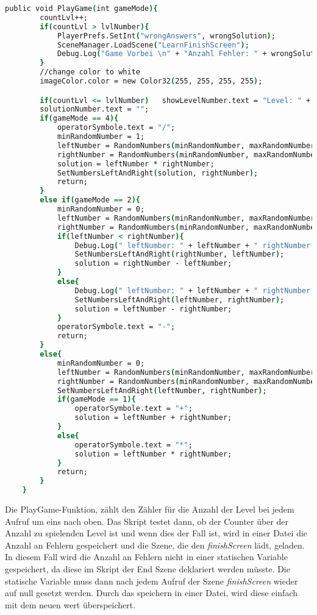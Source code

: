 \begin{lstlisting}[language=csh, caption={MathOperations.cs PlayGame-Funktion}]
public void PlayGame(int gameMode){
		countLvl++;
		if(countLvl > lvlNumber){
			PlayerPrefs.SetInt("wrongAnswers", wrongSolution);
			SceneManager.LoadScene("LearnFinishScreen");
			Debug.Log("Game Vorbei \n" + "Anzahl Fehler: " + wrongSolution);
		}
		//change color to white
		imageColor.color = new Color32(255, 255, 255, 255);

		if(countLvl <= lvlNumber)	showLevelNumber.text = "Level: " + countLvl + "/" + lvlNumber;
		solutionNumber.text = "";
		if(gameMode == 4){
			operatorSymbole.text = "/";
			minRandomNumber = 1;
			leftNumber = RandomNumbers(minRandomNumber, maxRandomNumber);
			rightNumber = RandomNumbers(minRandomNumber, maxRandomNumber);
			solution = leftNumber * rightNumber;
			SetNumbersLeftAndRight(solution, rightNumber);
			return;
		}
		else if(gameMode == 2){
			minRandomNumber = 0;
			leftNumber = RandomNumbers(minRandomNumber, maxRandomNumber);
			rightNumber = RandomNumbers(minRandomNumber, maxRandomNumber);
			if(leftNumber < rightNumber){
				Debug.Log(" leftNumber: " + leftNumber + " rightNumber: " + rightNumber + "zweite If");
				SetNumbersLeftAndRight(rightNumber, leftNumber);
				solution = rightNumber - leftNumber;
			}
			else{
				Debug.Log(" leftNumber: " + leftNumber + " rightNumber: " + rightNumber + "zweite If");
				SetNumbersLeftAndRight(leftNumber, rightNumber);
				solution = leftNumber - rightNumber;
			}
			operatorSymbole.text = "-";
			return;
		}
		else{
			minRandomNumber = 0;
			leftNumber = RandomNumbers(minRandomNumber, maxRandomNumber);
			rightNumber = RandomNumbers(minRandomNumber, maxRandomNumber);
			SetNumbersLeftAndRight(leftNumber, rightNumber);
			if(gameMode == 1){
				operatorSymbole.text = "+";
				solution = leftNumber + rightNumber;
			}
			else{
				operatorSymbole.text = "*";
				solution = leftNumber * rightNumber;
			}
			return;
		}
	}
\end{lstlisting}
Die PlayGame-Funktion, zählt den Zähler für die Anzahl der Level bei jedem Aufruf um eins nach oben. Das Skript testet dann, ob der Counter über der Anzahl zu spielenden Level ist und wenn dies der Fall ist, wird in einer Datei die Anzahl an Fehlern gespeichert und die Szene, die den \textit{finishScreen} lädt, geladen. In diesem Fall wird die Anzahl an Fehlern nicht in einer statischen Variable gespeichert, da diese im Skript der End Szene deklariert werden müsste. Die statische Variable muss dann nach jedem Aufruf der Szene \textit{finishScreen} wieder auf null gesetzt werden. Durch das speichern in einer Datei, wird diese einfach mit dem neuen wert überspeichert.\\
